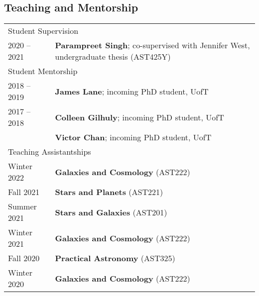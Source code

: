 \documentclass[10pt]{res} %
\begin{document}
\begin{resume}

\section{\Large Teaching and Mentorship}
\vspace{-5pt} %
\noindent\makebox[\linewidth]{\rule{\textwidth}{0.4pt}}
\vspace{-20pt} %
\begin{table}[h!]
\begin{tabularx}{\textwidth}{ @{} p{6.5em} X @{} }
%
%
\multicolumn{2}{l}{ \rule{0pt}{3ex} \large \hspace{-12pt} Student Supervision \dotfill \rule[-1.2ex]{0pt}{0pt}} \\
2020 -- 2021 & \textbf{Parampreet Singh}; co-supervised with Jennifer West, undergraduate thesis (AST425Y) \\
%
%
\multicolumn{2}{l}{ \rule{0pt}{3ex} \large \hspace{-12pt} Student Mentorship \dotfill \rule[-1.2ex]{0pt}{0pt}} \\
2018 -- 2019 & \textbf{James Lane}; incoming PhD student, UofT \\
2017 -- 2018 & \textbf{Colleen Gilhuly}; incoming PhD student, UofT \\
                     & \textbf{Victor Chan}; incoming PhD student, UofT \\
%
%
\multicolumn{2}{l}{ \rule{0pt}{3ex} \large \hspace{-12pt} Teaching Assistantships \dotfill \rule[-1.2ex]{0pt}{0pt}} \\
Winter 2022    & \textbf{Galaxies and Cosmology} (AST222) \\
Fall 2021        & \textbf{Stars and Planets} (AST221) \\
Summer 2021 & \textbf{Stars and Galaxies} (AST201) \\
Winter 2021    & \textbf{Galaxies and Cosmology} (AST222) \\
Fall 2020         & \textbf{Practical Astronomy} (AST325) \\
Winter 2020    & \textbf{Galaxies and Cosmology} (AST222) \\

\end{tabularx}
\end{table}
\end{resume}
\end{document}
